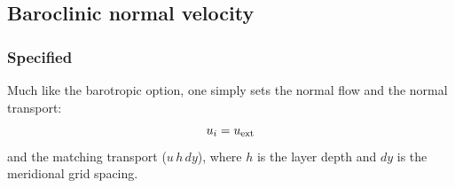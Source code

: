 \documentclass[11pt]{article}
\begin{document}
\subsection{Baroclinic normal velocity}
\subsubsection{Specified}
Much like the barotropic option, one simply sets the normal flow
and the normal transport:
\begin{equation}
  u_{i} = u_{\rm ext}
\end{equation}
and the matching transport ($u \, h \, dy$),
where $h$ is the layer depth and $dy$ is the meridional grid
spacing.

\end{document}
